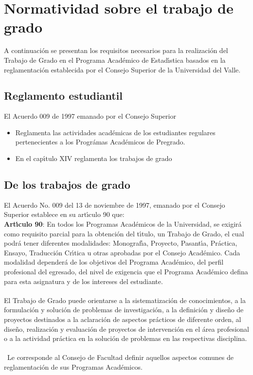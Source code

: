 \chapter{Normatividad sobre el trabajo de grado}

A continuaci\'{o}n se presentan los requisitos necesarios para la realizaci\'{o}n del Trabajo de Grado en el Programa Acad\'{e}mico de Estad\'{\i}stica basados en la reglamentaci\'{o}n establecida por el Consejo Superior de la Universidad del Valle.

\section{Reglamento estudiantil}

El Acuerdo 009 de 1997 emanado por el Consejo Superior
\begin{itemize}
\item Reglamenta las actividades acad\'{e}micas de los estudiantes regulares pertenecientes a los Progr\'{a}mas Acad\'{e}micos de Pregrado.

\item En el cap\'{\i}tulo XIV reglamenta los trabajos de grado
\end{itemize}

\section{De los trabajos de grado}

El Acuerdo No. 009 del 13 de noviembre de 1997, emanado por el Consejo Superior establece en su art\'{\i}culo 90 que:\\

\textbf{Art\'{\i}culo 90}: En todos los Programas Acad\'{e}micos de la Universidad,
se exigir\'{a} como requisito parcial para la obtenci\'{o}n del t\'{\i}tulo, un Trabajo de Grado, el cual podr\'{a} tener diferentes modalidades: Monograf\'{\i}a,
Proyecto, Pasant\'{\i}a, Pr\'{a}ctica, Ensayo, Traducci\'{o}n Cr\'{\i}tica u otras
aprobadas por el Consejo Acad\'{e}mico. Cada modalidad depender\'{a} de los objetivos del Programa Acad\'{e}mico, del perfil profesional del egresado, del nivel de exigencia que el Programa Acad\'{e}mico defina para esta asignatura y de los intereses del estudiante.\\\\ El Trabajo de Grado puede orientarse a la sistematizaci\'{o}n de conocimientos, a la formulaci\'{o}n y soluci\'{o}n de problemas de investigaci\'{o}n, a la definici\'{o}n y dise\~{n}o de proyectos destinados a la aclaraci\'{o}n de aspectos pr\'{a}cticos de diferente orden, al dise\~{n}o, realizaci\'{o}n y evaluaci\'{o}n de proyectos de intervenci\'{o}n en el \'{a}rea profesional o a la actividad pr\'{a}ctica en la soluci\'{o}n de problemas en las
respectivas disciplina.\\\\\
Le corresponde al Consejo de Facultad definir aquellos aspectos comunes de reglamentaci\'{o}n de sus Programas Acad\'{e}micos.\\


